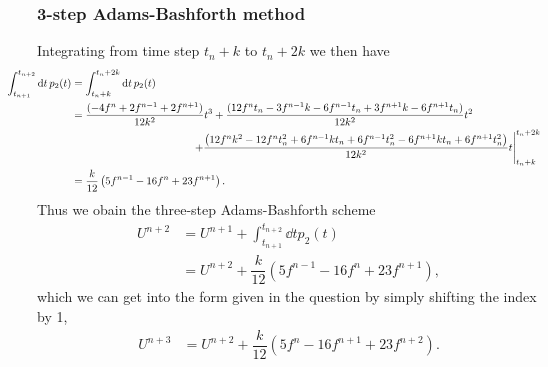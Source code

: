 \documentclass[12pt]{article}
\begin{document}
\subsubsection*{3-step Adams-Bashforth method}
Integrating from time step $t_{n}+k$ to $t_{n}+2k$ we then have
\begin{subequations}
	\begin{align}
		\hspace{-1cm}\int_{t_{n+1}}^{t_{n+2}}\dd{t}p_{2}(t) &= \int_{t_{n}+k}^{t_{n}+2k}\dd{t}p_{2}(t)\\
		&= \frac{(-4f^{n}+2f^{n-1}+2f^{n+1})}{12k^2}t^3 +\frac{(12f^{n}
		t_{n}-3f^{n-1}k-6f^{n-1}t_{n}+3f^{n+1}k-6f^{n+1}t_{n})}{12 k^2}t^2\nonumber \\ 
		&\hspace{4cm}\left.+\frac{\left(12f^{n}k^2-12f^{n}t_{n}^2+6
		f^{n-1} k t_{n}+6 f^{n-1} t_{n}^2-6f^{n+1}k t_{n}+6
		f^{n+1}t_{n}^2\right)}{12 k^2}t\right|_{t_{n}+k}^{t_{n}+2k}\\
		&= \dfrac{k}{12}\left(5f^{n-1}-16f^{n}+23f^{n+1}\right).
	\end{align}
\end{subequations}
Thus we obain the three-step Adams-Bashforth scheme
\begin{subequations}
	\begin{align}
		U^{n+2} &= U^{n+1} + \int_{t_{n+1}}^{t_{n+2}}\dd{t}p_{2}(t)\\
		&= U^{n+2} + \dfrac{k}{12}\left(5f^{n-1}-16f^{n}+23f^{n+1}\right),
	\end{align}
\end{subequations}
which we can get into the form given in the question by simply shifting the index by 1, 
\begin{align}
	U^{n+3} &= U^{n+2} + \dfrac{k}{12}\left(5f^{n}-16f^{n+1}+23f^{n+2}\right).
\end{align}
\end{document}
